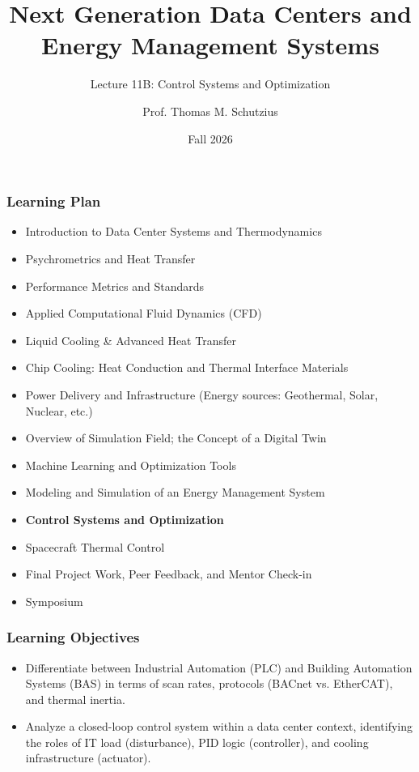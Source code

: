 \documentclass[aspectratio=169,10pt,xcolor={table,dvipsnames},t]{beamer}
\title[lecture 11]{Next Generation Data Centers and Energy Management Systems}
\subtitle{Lecture 11B: Control Systems and Optimization}
\author{Prof. Thomas M. Schutzius}
\institute{Department of Mechanical Engineering}
\date{Fall 2026}
\begin{document}
\begin{frame}
  \titlepage
\end{frame}


{
\smallframetitle %

\begin{frame}
	\frametitle{Learning Plan}
	\begin{itemize}
		\item Introduction to Data Center Systems and Thermodynamics 
		\item Psychrometrics and Heat Transfer
		\item Performance Metrics and Standards
		\item Applied Computational Fluid Dynamics (CFD)
		\item Liquid Cooling \& Advanced Heat Transfer
		\item Chip Cooling: Heat Conduction and Thermal Interface Materials
		\item Power Delivery and Infrastructure (Energy sources: Geothermal, Solar, Nuclear, etc.)
		\item Overview of Simulation Field; the Concept of a Digital Twin
		\item Machine Learning and Optimization Tools
		\item Modeling and Simulation of an Energy Management System
		\item \textbf{Control Systems and Optimization}
		\item Spacecraft Thermal Control
		\item Final Project Work, Peer Feedback, and Mentor Check-in 
		\item Symposium 
	\end{itemize}		
\end{frame}

\begin{frame}
	\frametitle{Learning Objectives} 
		\begin{itemize}
    			\item Differentiate between Industrial Automation (PLC) and Building Automation Systems (BAS) in terms of scan rates, protocols (BACnet vs. EtherCAT), and thermal inertia.
			\item Analyze a closed-loop control system within a data center context, identifying the roles of IT load (disturbance), PID logic (controller), and cooling infrastructure (actuator).
		\end{itemize}		
\end{frame}


}
\end{document}
